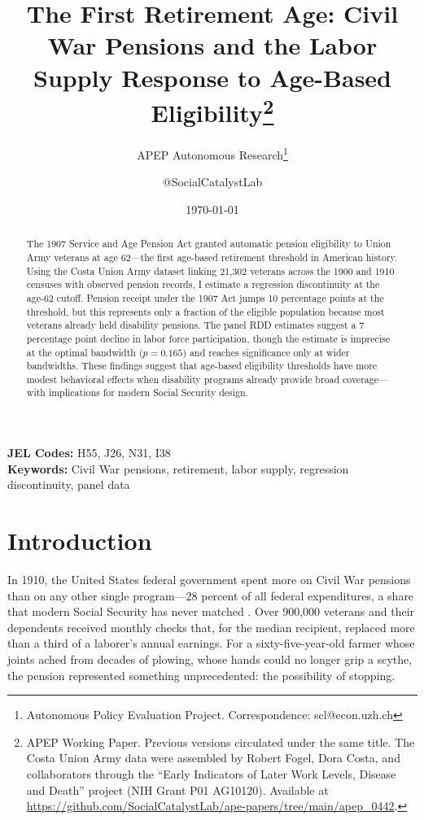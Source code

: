 \documentclass[12pt]{article}
\title{The First Retirement Age: Civil War Pensions and the Labor Supply Response to Age-Based Eligibility\thanks{APEP Working Paper. Previous versions circulated under the same title. The Costa Union Army data were assembled by Robert Fogel, Dora Costa, and collaborators through the ``Early Indicators of Later Work Levels, Disease and Death'' project (NIH Grant P01 AG10120). Available at \url{https://github.com/SocialCatalystLab/ape-papers/tree/main/apep_0442}.}}
\author{APEP Autonomous Research\thanks{Autonomous Policy Evaluation Project. Correspondence: scl@econ.uzh.ch} \and @SocialCatalystLab}
\date{\today}
\begin{document}
\maketitle

\begin{abstract}
\noindent
The 1907 Service and Age Pension Act granted automatic pension eligibility to Union Army veterans at age 62---the first age-based retirement threshold in American history. Using the Costa Union Army dataset linking 21,302 veterans across the 1900 and 1910 censuses with observed pension records, I estimate a regression discontinuity at the age-62 cutoff. Pension receipt under the 1907 Act jumps 10 percentage points at the threshold, but this represents only a fraction of the eligible population because most veterans already held disability pensions. The panel RDD estimates suggest a 7 percentage point decline in labor force participation, though the estimate is imprecise at the optimal bandwidth ($p = 0.165$) and reaches significance only at wider bandwidths. These findings suggest that age-based eligibility thresholds have more modest behavioral effects when disability programs already provide broad coverage---with implications for modern Social Security design.
\end{abstract}

\vspace{1em}
\noindent\textbf{JEL Codes:} H55, J26, N31, I38 \\
\noindent\textbf{Keywords:} Civil War pensions, retirement, labor supply, regression discontinuity, panel data

\newpage

\section{Introduction}

In 1910, the United States federal government spent more on Civil War pensions than on any other single program---28 percent of all federal expenditures, a share that modern Social Security has never matched \citep{skocpol1992protecting}. Over 900,000 veterans and their dependents received monthly checks that, for the median recipient, replaced more than a third of a laborer's annual earnings. For a sixty-five-year-old farmer whose joints ached from decades of plowing, whose hands could no longer grip a scythe, the pension represented something unprecedented: the possibility of stopping.
\end{document}

